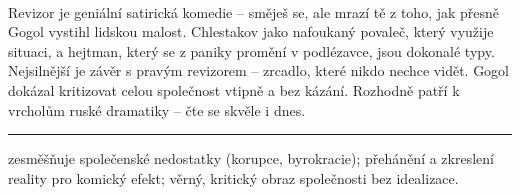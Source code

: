 \documentclass[FGBook.tex]{subfiles}
\begin{document}
\vspace*{2em}\\
\noindent Revizor je geniální satirická komedie – směješ se, ale mrazí tě z toho, jak přesně Gogol vystihl lidskou malost. Chlestakov jako nafoukaný povaleč, který využije situaci, a hejtman, který se z paniky promění v podlézavce, jsou dokonalé typy. Nejsilnější je závěr s pravým revizorem – zrcadlo, které nikdo nechce vidět. Gogol dokázal kritizovat celou společnost vtipně a bez kázání. Rozhodně patří k vrcholům ruské dramatiky – čte se skvěle i dnes.

\vfill

\noindent\begin{minipage}{\textwidth}
    {\textcolor{\wpagecolor}{\rule{\linewidth}{0.4pt}}
    \footnotesize
     zesměšňuje společenské nedostatky (korupce, byrokracie); 
     přehánění a zkreslení reality pro komický efekt; 
     věrný, kritický obraz společnosti bez idealizace.
    }
\end{minipage}

\newpage
\end{document}

